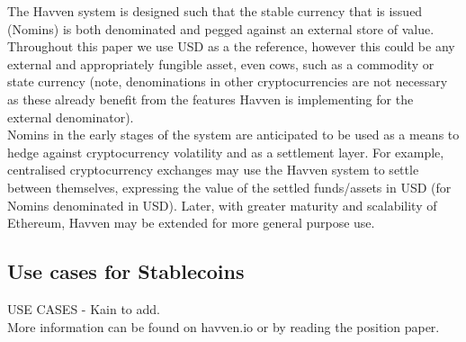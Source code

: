 \noindent The Havven system is designed such that the stable currency that is issued (Nomins) is both denominated and pegged against an external store of value. Throughout this paper we use USD as a the reference, however this could be any external and appropriately fungible asset, even cows, such as a commodity or state currency (note, denominations in other cryptocurrencies are not necessary as these already benefit from the features Havven is implementing for the external denominator). \\

\noindent Nomins in the early stages of the system are anticipated to be used as a means to hedge against cryptocurrency volatility and as a settlement layer. For example, centralised cryptocurrency exchanges may use the Havven system to settle between themselves, expressing the value of the settled funds/assets in USD (for Nomins denominated in USD). Later, with greater maturity and scalability of Ethereum, Havven may be extended for more general purpose use. \\


\subsection{Use cases for Stablecoins}
\noindent USE CASES - Kain to add. \\

\noindent More information can be found on havven.io or by reading the position paper.

\pagebreak
